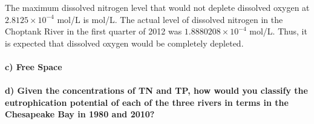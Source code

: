 \documentclass[
]{article}
\let\oldparagraph\paragraph
\renewcommand{\paragraph}[1]{\oldparagraph{#1}\mbox{}}
\begin{document}
The maximum dissolved nitrogen level that would not deplete dissolved
oxygen at \ensuremath{2.8125\times 10^{-4}} mol/L is mol/L. The actual
level of dissolved nitrogen in the Choptank River in the first quarter
of 2012 was \ensuremath{1.8880208\times 10^{-4}} mol/L. Thus, it is
expected that dissolved oxygen would be completely depleted.

\hypertarget{c-free-space}{%
\paragraph{c) Free Space}\label{c-free-space}}

\hypertarget{d-given-the-concentrations-of-tn-and-tp-how-would-you-classify-the-eutrophication-potential-of-each-of-the-three-rivers-in-terms-in-the-chesapeake-bay-in-1980-and-2010}{%
\paragraph{d) Given the concentrations of TN and TP, how would you
classify the eutrophication potential of each of the three rivers in
terms in the Chesapeake Bay in 1980 and
2010?}\label{d-given-the-concentrations-of-tn-and-tp-how-would-you-classify-the-eutrophication-potential-of-each-of-the-three-rivers-in-terms-in-the-chesapeake-bay-in-1980-and-2010}}
\end{document}
